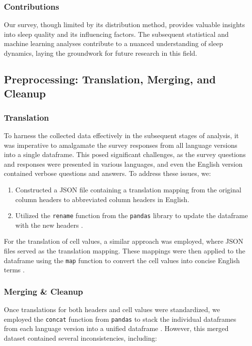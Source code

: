 \documentclass[conference]{IEEEtran}
\begin{document}
\subsubsection*{Contributions}
Our survey, though limited by its distribution method, provides valuable insights into sleep quality and its influencing factors. The subsequent statistical and machine learning analyses contribute to a nuanced understanding of sleep dynamics, laying the groundwork for future research in this field.
\subsection{Preprocessing: Translation, Merging, and Cleanup}
\subsubsection*{Translation}
To harness the collected data effectively in the subsequent stages of analysis, it was imperative to amalgamate the survey responses from all language versions into a single dataframe. This posed significant challenges, as the survey questions and responses were presented in various languages, and even the English version contained verbose questions and answers. To address these issues, we:

\begin{enumerate}
  \item Constructed a JSON file containing a translation mapping from the original column headers to abbreviated column headers in English.
  \item Utilized the \texttt{rename} function from the \texttt{pandas} library to update the dataframe with the new headers \cite{dfrename}.
\end{enumerate}

For the translation of cell values, a similar approach was employed, where JSON files served as the translation mapping. These mappings were then applied to the dataframe using the \texttt{map} function to convert the cell values into concise English terms \cite{dfmap}.

\subsubsection*{Merging \& Cleanup}
Once translations for both headers and cell values were standardized, we employed the \texttt{concat} function from \texttt{pandas} to stack the individual dataframes from each language version into a unified dataframe \cite{pdconcat}. However, this merged dataset contained several inconsistencies, including:
\end{document}
